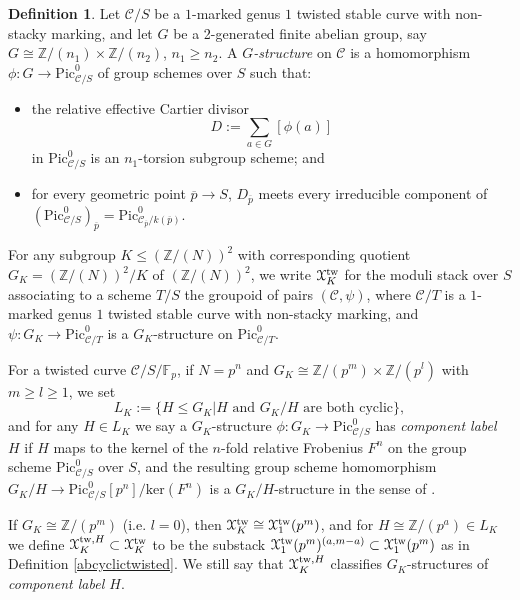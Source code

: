 \documentclass[11pt]{amsart}
\theoremstyle{definition}
\newtheorem{definition}[subsection]{Definition}
\begin{document}
\begin{definition}
Let ${\mathcal{C}}/S$ be a $1$-marked genus $1$ twisted stable curve with non-stacky marking, and let $G$ be a 2-generated finite abelian group, say $G \cong \mathbb{Z}/(n_1) \times \mathbb{Z}/(n_2)$, $n_1 \geq n_2$. A \textit{$G$-structure} on ${\mathcal{C}}$ is a homomorphism $\phi: G \rightarrow \mathrm{Pic}^0_{{\mathcal{C}}/S}$ of group schemes over $S$ such that:
\begin{itemize}
  \item the relative effective Cartier divisor 
  \begin{displaymath}
  D := \sum_{a \in G} [\phi(a)]
  \end{displaymath}
  in $\mathrm{Pic}^0_{{\mathcal{C}}/S}$ is an $n_1$-torsion subgroup scheme; and 
  \item for every geometric point $\overline{p} \rightarrow S$, $D_{\overline{p}}$ meets every irreducible component of $(\mathrm{Pic}^0_{{\mathcal{C}}/S})_{\overline{p}} = \mathrm{Pic}^0_{{\mathcal{C}}_{\overline{p}}/k(\overline{p})}$.
\end{itemize}

For any subgroup $K \leq (\mathbb{Z}/(N))^2$ with corresponding quotient $G_K = (\mathbb{Z}/(N))^2/K$ of $(\mathbb{Z}/(N))^2$, we write ${\mathbf{\EuScript{X}}}^{\mathrm{tw}}_K$ for the moduli stack over $S$ associating to a scheme $T/S$ the groupoid of pairs $({\mathcal{C}},\psi)$, where ${\mathcal{C}}/T$ is a $1$-marked genus $1$ twisted stable curve with non-stacky marking, and $\psi: G_K \rightarrow \mathrm{Pic}^0_{{\mathcal{C}}/T}$ is a $G_K$-structure on $\mathrm{Pic}^0_{{\mathcal{C}}/T}$. 

For a twisted curve ${\mathcal{C}}/S/\mathbb{F}_p$, if $N = p^n$ and $G_K \cong \mathbb{Z}/(p^m) \times \mathbb{Z}/(p^l)$ with $m\geq l \geq 1$, we set 
\begin{displaymath}
L_K := \{H \leq G_K|\textrm{$H$ and $G_K/H$ are both cyclic}\},
\end{displaymath}
and for any $H \in L_K$ we say a $G_K$-structure $\phi: G_K \rightarrow \mathrm{Pic}^0_{{\mathcal{C}}/S}$ has \textit{component label $H$} if $H$ maps to the kernel of the $n$-fold relative Frobenius $F^n$ on the group scheme $\mathrm{Pic}^0_{{\mathcal{C}}/S}$ over $S$, and the resulting group scheme homomorphism $G_K/H \rightarrow \mathrm{Pic}^0_{{\mathcal{C}}/S}[p^n]/\mathrm{ker}(F^n)$ is a $G_K/H$-structure in the sense of \cite[\S1.5]{KM1}.

If $G_K \cong \mathbb{Z}/(p^m)$ (i.e. $l=0$), then ${\mathbf{\EuScript{X}}}^{\mathrm{tw}}_K \cong {\mathbf{\EuScript{X}}}^{\mathrm{tw}}_1(p^m)$, and for $H \cong \mathbb{Z}/(p^a) \in L_K$ we define ${\mathbf{\EuScript{X}}}^{\mathrm{tw},H}_K \subset {\mathbf{\EuScript{X}}}^{\mathrm{tw}}_K$ to be the substack ${\mathbf{\EuScript{X}}}^{\mathrm{tw}}_1(p^m)^{(a,m-a)} \subset {\mathbf{\EuScript{X}}}^{\mathrm{tw}}_1(p^m)$ as in Definition \ref{abcyclictwisted}. We still say that ${\mathbf{\EuScript{X}}}^{\mathrm{tw},H}_K$ classifies $G_K$-structures of \textit{component label $H$}.
\end{definition}
\end{document}
